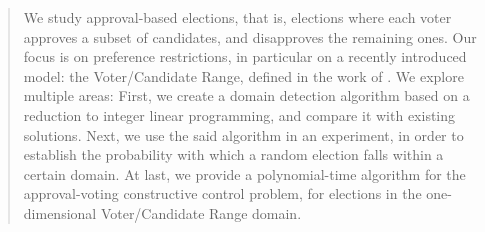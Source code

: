 \begin{abstract}

    We study approval-based elections, that is, elections where each voter approves a subset of candidates,
    and disapproves the remaining ones.
    Our focus is on preference restrictions, in particular on a recently introduced model: the Voter/Candidate Range,
    defined in the work of \cite{faliszewski-vcr}. 
    We explore multiple areas: First, we create a domain detection algorithm based on a reduction to integer linear programming,
    and compare it with existing solutions. Next, we use the said algorithm in an experiment,
    in order to establish the probability with which a random election falls within a certain domain.
    At last, we provide a polynomial-time algorithm for the approval-voting constructive control problem,
    for elections in the one-dimensional Voter/Candidate Range domain.

\end{abstract}
